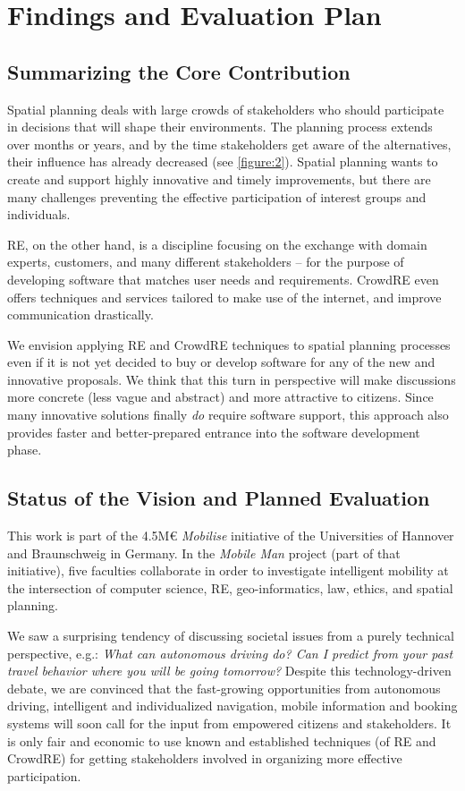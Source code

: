 \documentclass[conference]{IEEEtran}
\begin{document}
\section{Findings and Evaluation Plan}
\label{ch:6}
\subsection{Summarizing the Core Contribution}
Spatial planning deals with large crowds of stakeholders who should participate 
in decisions that will shape their environments. The planning process extends 
over months or years, and by the time stakeholders get aware of the 
alternatives, their influence has already decreased (see 
\figurename{ \ref{figure:2}}). Spatial planning wants to create and support 
highly innovative and timely improvements, but there are many challenges 
preventing the effective participation of interest groups and individuals.

RE, on the other hand, is a discipline focusing on the exchange with domain 
experts, customers, and many different stakeholders -- for the purpose of 
developing software that matches user needs and requirements. CrowdRE even 
offers techniques and services tailored to make use of the internet, and 
improve communication drastically.

We envision applying RE and CrowdRE techniques to spatial planning processes 
even if it is not yet decided to buy or develop software for any of the new and 
innovative proposals. We think that this turn in perspective will make 
discussions more concrete (less vague and abstract) and more attractive to 
citizens. Since many innovative solutions finally \textit{do} require software 
support, this approach also provides faster and better-prepared entrance 
into the software development phase.

\subsection{Status of the Vision and Planned Evaluation}
This work is part of the 4.5M€ \textit{Mobilise} initiative of 
the Universities of Hannover and Braunschweig in Germany. In the \textit{Mobile 
Man} project (part of that initiative), five faculties collaborate in order to 
investigate intelligent mobility at the intersection of computer science, 
RE, geo-informatics, law, ethics, and spatial planning. 

We saw a surprising tendency of discussing societal issues from a purely 
technical perspective, e.g.: \textit{What can autonomous driving do? Can I 
predict from your past travel behavior where you will be going tomorrow?} 
Despite this technology-driven debate, we are convinced that the fast-growing 
opportunities from autonomous driving, intelligent and individualized 
navigation, mobile information and booking systems will soon call for the input 
from empowered citizens and stakeholders. It is only fair and economic to use 
known and established techniques (of RE and CrowdRE) for getting stakeholders 
involved in organizing more effective participation.
\end{document}
